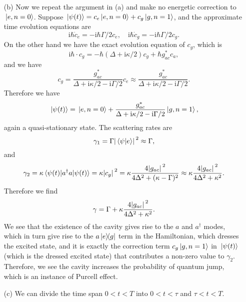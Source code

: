 \documentclass[hyperref, a4paper]{article}
\newcommand*{\ii}{\mathrm{i}}
\begin{document}
\begin{itemize}
\item[(b)] Now we repeat the argument in (a) and make no energetic correction to $\ket*{e, n=0}$. Suppose 
$\ket*{\psi(t)} = c_e \ket*{e, n=0} + c_g \ket*{g, n=1}$, and the approximate time evolution equations are 
\[
    \ii \hbar \dot{c}_e = - \ii \hbar \Gamma / 2 c_e, \quad \ii \hbar \dot{c}_g = - \ii \hbar \Gamma / 2 c_g.
\]
On the other hand we have the exact evolution equation of $c_g$, which is 
\[
    \ii \hbar \cdot{c}_g = - \hbar (\Delta + \ii \kappa / 2) c_g + \hbar g_{ac}^* c_a,
\]
and we have 
\[
    c_g = \frac{g_{ac}^*}{\Delta + \ii \kappa / 2 - \ii \Gamma / 2} c_e \approx \frac{g_{ac}^*}{\Delta + \ii \kappa / 2 - \ii \Gamma / 2}.
\]
Therefore we have 
\begin{equation}
    \ket*{\psi(t)} = \ket*{e, n=0} + \frac{g_{ac}^*}{\Delta + \ii \kappa / 2 - \ii \Gamma / 2} \ket*{g, n=1},
\end{equation}
again a quasi-stationary state. The scattering rates are 
\begin{equation}
    \gamma_1 = \Gamma \abs*{\braket*{\psi}{e}}^2 \approx \Gamma ,
\end{equation}
and 
\begin{equation}
    \gamma_2 = \kappa \expval*{a^\dagger a}{\psi(t)} = \kappa \abs*{c_g}^2 = \kappa \frac{4 \abs*{g_{ac}}^2}{4 \Delta^2 + (\kappa - \Gamma)^2} \approx \kappa \frac{4 \abs*{g_{ac}}^2}{4 \Delta^2 + \kappa^2} .
\end{equation}
Therefore we find 
\begin{equation}
    \gamma = \Gamma + \kappa \frac{4 \abs*{g_{ac}}^2}{4 \Delta^2 + \kappa^2}.
\end{equation}
We see that the existence of the cavity gives rise to the $a$ and $a^\dagger$ modes, which in turn give rise 
to the $a \dyad*{e}{g}$ term in the Hamiltonian, which dresses the excited state, and it is exactly the 
correction term $c_g \ket*{g, n=1}$ in $\ket*{\psi(t)}$ (which is the dressed excited state) that contributes 
a non-zero value to $\gamma_2$. Therefore, we see the cavity increases the probability of quantum jump, which 
is an instance of Purcell effect.

\item[(c)] We can divide the time span $0 < t < T$ into $0 < t < \tau$ and $\tau < t < T$.
 

\end{itemize}
\end{document}
